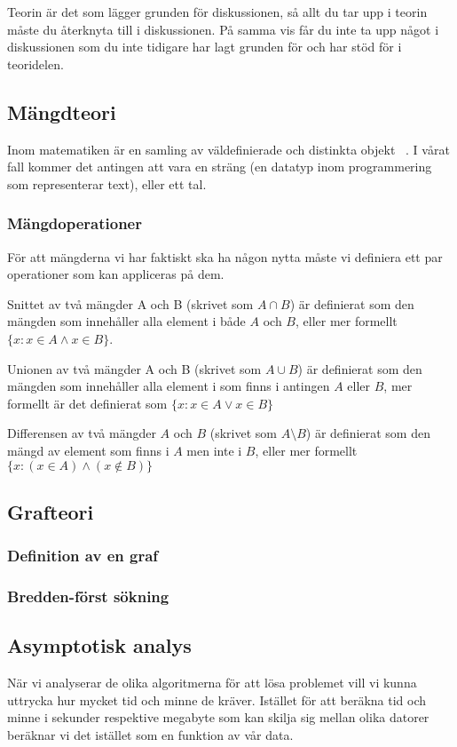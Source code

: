 \documentclass{article}
\begin{document}
Teorin är det som lägger grunden för diskussionen, så allt du tar upp i teorin måste du återknyta till i diskussionen. På samma vis får du inte ta upp något i diskussionen som du inte tidigare har lagt grunden för och har stöd för i teoridelen.

\subsection{Mängdteori}
Inom matematiken är en samling av väldefinierade och distinkta objekt ~\cite{wiki:set}. I vårat fall kommer det antingen att vara en sträng (en datatyp inom programmering som representerar text), eller ett tal.

\subsubsection{Mängdoperationer}
För att mängderna vi har faktiskt ska ha någon nytta måste vi definiera ett par operationer som kan appliceras på dem. 

Snittet av två mängder A och B (skrivet som $A \cap B$) är definierat som den mängden som innehåller alla element i både $A$ och $B$, eller mer formellt $\{x : x \in A \land x \in B\}$. 

Unionen av två mängder A och B (skrivet som $A \cup B$) är definierat som den mängden som innehåller alla element i som finns i antingen $A$ eller $B$, mer formellt är det definierat som $\{x : x \in A \lor x \in B\}$

Differensen av två mängder $A$ och $B$ (skrivet som $A \setminus B$) är definierat som den mängd av element som finns i $A$ men inte i $B$, eller mer formellt $\{x : (x \in A) \land (x \notin B) \}$


\subsection{Grafteori}


\subsubsection{Definition av en graf}


\subsubsection{Bredden-först sökning}


\subsection{Asymptotisk analys}
När vi analyserar de olika algoritmerna för att lösa problemet vill vi kunna uttrycka hur mycket tid och minne de kräver. Istället för att beräkna tid och minne i sekunder respektive megabyte som kan skilja sig mellan olika datorer beräknar vi det istället som en funktion av vår data. 
\end{document}
